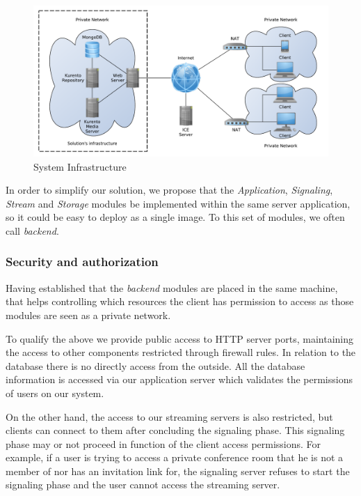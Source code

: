\documentclass[conference,compsoc,a4paper]{IEEEtran}
\begin{document}
\begin{figure}[H]
	\centering
	\includegraphics[width=\linewidth]{figures/infrastructure.pdf}
	\caption{System Infrastructure}
\end{figure}

In order to simplify our solution, we propose that the \emph{Application}, \emph{Signaling}, \emph{Stream} and \emph{Storage} modules be implemented within the same server application, so it could be easy to deploy as a single image. To this set of modules, we often call \emph{backend}.

	\subsubsection{Security and authorization}

Having established that the \emph{backend} modules are placed in the same machine, that helps controlling which resources the client has permission to access as those modules are seen as a private network.

To qualify the above we provide public access to \gls{HTTP} server ports, maintaining the access to other components restricted through firewall rules.
In relation to the database there is no directly access from the outside. All the database information is accessed via our application server which validates the permissions of users on our system.

On the other hand, the access to our streaming servers is also restricted, but clients can connect to them after concluding the signaling phase. This signaling phase may or not proceed in function of the client access permissions. For example, if a user is trying to access a private conference room that he is not a member of nor has an invitation link for, the signaling server refuses to start the signaling phase and the user cannot access the streaming server.
\end{document}
